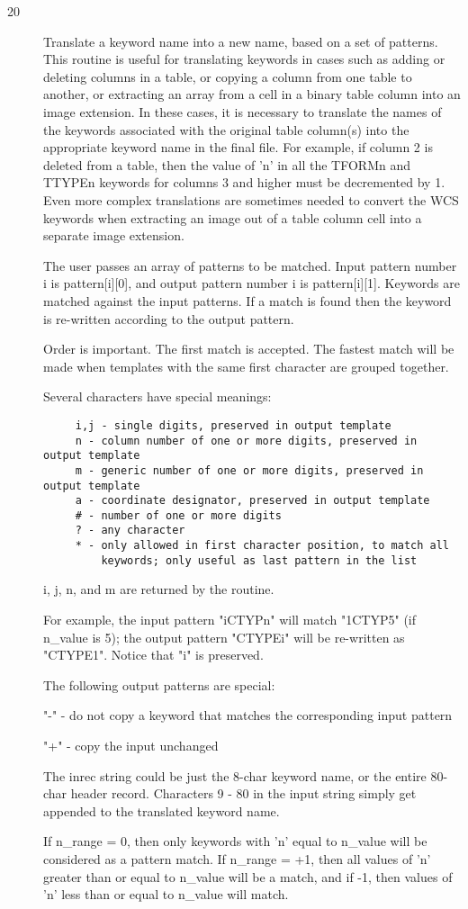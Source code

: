\documentclass[11pt]{book}
\begin{document}
\begin{description}
\item[20]  Translate a keyword name into a new name, based on a set of patterns.
This routine is useful for translating keywords in cases such as
adding or deleting columns in
a table, or copying a column from one table to another, or extracting
an array from a cell in a binary table column into an image extension.  In
these cases, it is necessary to translate the names of the keywords associated
with the original table column(s) into the appropriate keyword name in the final
file.  For example, if column 2 is deleted from a table,
then the value of 'n' in all the
TFORMn and TTYPEn keywords for columns 3 and higher must be decremented
by 1.  Even more complex translations are sometimes needed to convert the
WCS keywords when extracting an image out of a table column cell into
a separate image extension.

The user passes an array of patterns to be matched.  Input pattern
number i is pattern[i][0], and output pattern number i is
pattern[i][1].  Keywords are matched against the input patterns.  If a
match is found then the keyword is re-written according to the output
pattern.

Order is important.  The first match is accepted.  The fastest match
will be made when templates with the same first character are grouped
together.

Several characters have special meanings:

\begin{verbatim}
     i,j - single digits, preserved in output template
     n - column number of one or more digits, preserved in output template
     m - generic number of one or more digits, preserved in output template
     a - coordinate designator, preserved in output template
     # - number of one or more digits
     ? - any character
     * - only allowed in first character position, to match all
         keywords; only useful as last pattern in the list
\end{verbatim}
i, j, n, and m are returned by the routine.

For example, the input pattern "iCTYPn" will match "1CTYP5" (if n\_value
is 5); the output pattern "CTYPEi" will be re-written as "CTYPE1".
Notice that "i" is preserved.

The following output patterns are special:

    "-" - do not copy a keyword that matches the corresponding input pattern

    "+" - copy the input unchanged

The inrec string could be just the 8-char keyword name, or the entire
80-char header record.  Characters 9 - 80 in the input string simply get
appended to the translated keyword name.

If n\_range = 0, then only keywords with 'n' equal to n\_value will be
considered as a pattern match.  If n\_range = +1, then all values of
'n' greater than or equal to n\_value will be a match, and if -1,
then values of 'n' less than or equal to n\_value will match.\label{translatekey}
\end{description}
\end{document}
